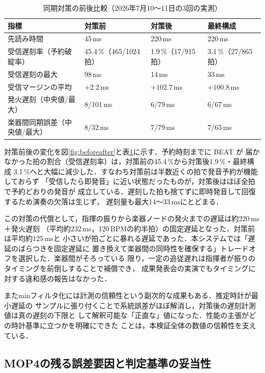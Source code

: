 \documentclass[uplatex,dvipdfmx]{jlreq}
\begin{document}
\begin{table}[tbp]
  \centering
  \caption{同期対策の前後比較（2026年7月10〜11日の3回の実測）}\label{tab:mop5}
  \small
  \begin{tabular}{llll}
    \hline
    指標 & 対策前 & 対策後 & 最終構成 \\
    \hline
    先読み時間 & 45\,ms & 220\,ms & 220\,ms \\
    受信遅刻率（予約破綻率） & 45.4\,\%（465/1024拍） & 1.9\,\%（17/915拍） & 3.1\,\%（27/865拍） \\
    受信遅刻の最大 & 98\,ms & 14\,ms & 33\,ms \\
    受信マージンの平均 & $+2.2$\,ms & $+102.7$\,ms & $+100.8$\,ms \\
    発火遅刻（中央値/最大） & 8/101\,ms & 6/79\,ms & 6/67\,ms \\
    楽器間同期誤差（中央値/最大） & 8/32\,ms & 7/79\,ms & 7/65\,ms \\
    \hline
  \end{tabular}
\end{table}

対策前後の変化を図\ref{fig:beforeafter}と表\ref{tab:mop5}に示す．予約時刻までに BEAT が
届かなかった拍の割合（受信遅刻率）は，対策前の45.4\,\%から対策後1.9\,\%・最終構成
3.1\,\%へと大幅に減少した．すなわち対策前は半数近くの拍で発音予約が機能しておらず
「受信したら即発音」に近い状態だったものが，対策後はほぼ全拍で予約どおりの発音が
成立している．遅刻した拍も捨てずに即時発音して回復するため演奏の欠落は生じず，
遅刻量も最大14〜33\,msにとどまる．

この対策の代償として，指揮の振りから楽器ノードの発火までの遅延は約220\,ms＋発火遅刻
（平均約232\,ms，120\,BPMの約半拍）の固定遅延となった．対策前は平均約125\,msと
小さいが拍ごとに暴れる遅延であった．本システムでは「遅延のばらつきを固定遅延に
置き換えて楽器間の同時性を確保する」トレードオフを選択した．楽器間がそろっている
限り，一定の追従遅れは指揮者が振りのタイミングを前倒しすることで補償でき，
成果発表会の実演でもタイミングに対する違和感の報告はなかった．

またminフィルタ化には計測の信頼性という副次的な成果もある．推定時計が最小遅延の
サンプルに張り付くことで系統誤差がほぼ解消し，対策後の遅刻計測値は真の遅刻の下限と
して解釈可能な「正直な」値になった．性能の主張がどの時計基準に立つかを明確にできた
ことは，本検証全体の数値の信頼性を支えている．

\subsection{MOP4の残る誤差要因と判定基準の妥当性}\label{sec:disc-stall}
\end{document}
